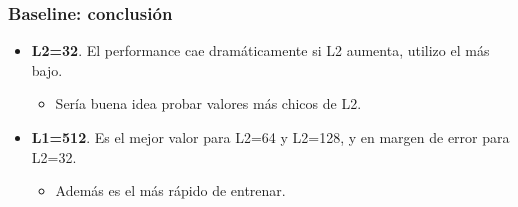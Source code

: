 \begin{frame}
\frametitle{Baseline: conclusión}
\begin{itemize}
\item \textbf{L2=32}. El performance cae dramáticamente si L2 aumenta, utilizo el más bajo.
\begin{itemize}
    \item Sería buena idea probar valores más chicos de L2. \pause
\end{itemize}
\item \textbf{L1=512}. Es el mejor valor para L2=64 y L2=128, y en margen de error para L2=32.
\begin{itemize}
    \item Además es el más rápido de entrenar.
\end{itemize}
\end{itemize}
\end{frame}
